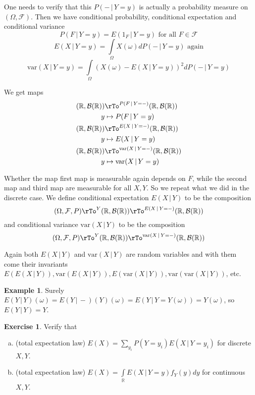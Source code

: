 \documentclass[12pt]{amsart}
\theoremstyle{definition}
\newtheorem{example}[theorem]{Example}
\newtheorem{exercise}[theorem]{Exercise}
\begin{document}
One needs to verify that this $P(- \,|\, Y = y)$ is actually a probability measure on $(\Omega, \mathcal{F})$. Then we have conditional probability, conditional expectation and conditional variance
$$P(F \,|\, Y = y) = E(1_F \,|\, Y = y) \text{ for all } F \in \mathcal{F}$$
$$E(X \,|\, Y = y) = \int\limits_{\Omega} X(\omega) dP(- \,|\, Y = y) \text{ again}$$
$$\text{var}(X \,|\, Y = y) = \int\limits_{\Omega} (X(\omega) - E(X \,|\, Y = y))^2 dP(- \,|\, Y = y)$$

We get maps
\begin{align*}
(\mathbb{R}, \mathcal{B}(\mathbb{R})) & \rTo^{P(F \,|\, Y = -)} (\mathbb{R}, \mathcal{B}(\mathbb{R})) \\
y & \mapsto P(F \,|\, Y = y) \\
(\mathbb{R}, \mathcal{B}(\mathbb{R})) & \rTo^{E(X \,|\, Y = -)} (\mathbb{R}, \mathcal{B}(\mathbb{R})) \\
y & \mapsto E(X \,|\, Y = y) \\
(\mathbb{R}, \mathcal{B}(\mathbb{R})) & \rTo^{\text{var}(X \,|\, Y = -)} (\mathbb{R}, \mathcal{B}(\mathbb{R})) \\
y & \mapsto \text{var}(X \,|\, Y = y)
\end{align*}

Whether the map first map is measurable again depends on $F$, while the second map and third map are measurable for all $X, Y$. So we repeat what we did in the discrete case.
\dfn We define conditional expectation $E(X \,|\, Y)$ to be the composition
$$(\Omega, \mathcal{F}, P) \rTo^Y (\mathbb{R}, \mathcal{B}(\mathbb{R})) \rTo^{E(X \,|\, Y = -)} (\mathbb{R}, \mathcal{B}(\mathbb{R}))$$
and conditional variance $\text{var}(X \,|\, Y)$ to be the composition
$$(\Omega, \mathcal{F}, P) \rTo^Y (\mathbb{R}, \mathcal{B}(\mathbb{R})) \rTo^{\text{var}(X \,|\, Y = -)} (\mathbb{R}, \mathcal{B}(\mathbb{R}))$$

Again both $E(X \,|\, Y)$ and $\text{var}(X \,|\, Y)$ are random variables and with them come their invariants $E(E(X \,|\, Y)), \text{var}(E(X \,|\, Y)), E(\text{var}(X \,|\, Y)), \text{var}(\text{var}(X \,|\, Y))$, etc.

\begin{example} \label{expected_value_Y_given_Y} Surely $E(Y \,|\, Y)(\omega) = E(Y \,|\, - )(Y)(\omega) = E(Y \,|\, Y = Y(\omega)) = Y(\omega)$, so $E(Y \,|\, Y) = Y$.
\end{example}

\begin{exercise} Verify that
\begin{enumerate}[a.]
\item (total expectation law) $E(X) = \sum\limits_{y_i} P(Y = y_i) E(X \,|\, Y = y_i)$ for discrete $X, Y$.
\item (total expectation law) $E(X) = \int\limits_{\mathbb{R}} E(X \,|\, Y = y)f_Y(y)dy$ for continuous $X, Y$.
\end{enumerate}
\end{exercise}
\end{document}
